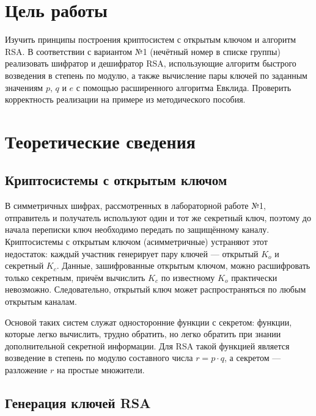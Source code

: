 \documentclass[14pt,a4paper]{extarticle}
\begin{document}

\tableofcontents

\section{Цель работы}

Изучить принципы построения криптосистем с открытым ключом и алгоритм RSA.
В соответствии с вариантом №1 (нечётный номер в списке группы) реализовать шифратор
и дешифратор RSA, использующие алгоритм быстрого возведения в степень по модулю, а
также вычисление пары ключей по заданным значениям $p$, $q$ и $e$ с помощью
расширенного алгоритма Евклида. Проверить корректность реализации на примере из
методического пособия.

\section{Теоретические сведения}

\subsection{Криптосистемы с открытым ключом}

В симметричных шифрах, рассмотренных в лабораторной работе №1, отправитель и получатель
используют один и тот же секретный ключ, поэтому до начала переписки ключ необходимо
передать по защищённому каналу. Криптосистемы с открытым ключом (асимметричные)
устраняют этот недостаток: каждый участник генерирует пару ключей --- открытый $K_o$
и секретный $K_c$. Данные, зашифрованные открытым ключом, можно расшифровать только
секретным, причём вычислить $K_c$ по известному $K_o$ практически невозможно.
Следовательно, открытый ключ может распространяться по любым открытым каналам.

Основой таких систем служат односторонние функции с секретом: функции, которые легко
вычислить, трудно обратить, но легко обратить при знании дополнительной секретной
информации. Для RSA такой функцией является возведение в степень по модулю составного
числа $r = p \cdot q$, а секретом --- разложение $r$ на простые множители.

\subsection{Генерация ключей RSA}
\end{document}

